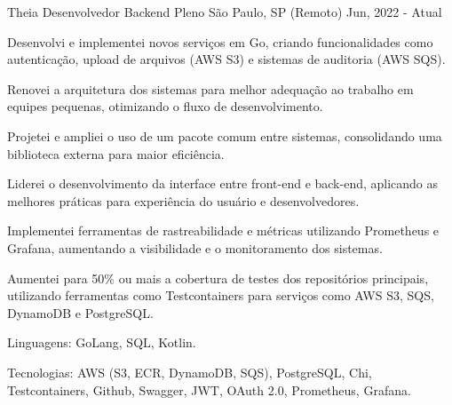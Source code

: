 \begin{cventries}
  \cventry
  {Theia} %
  {Desenvolvedor Backend Pleno} %
  {São Paulo, SP (Remoto)} %
  {Jun, 2022 - Atual} %
  {
    \begin{cvitems} %
      \item {Desenvolvi e implementei novos serviços em Go, criando funcionalidades como autenticação, upload de arquivos (AWS S3) e sistemas de auditoria (AWS SQS).}
      \item {Renovei a arquitetura dos sistemas para melhor adequação ao trabalho em equipes pequenas, otimizando o fluxo de desenvolvimento.}
      \item {Projetei e ampliei o uso de um pacote comum entre sistemas, consolidando uma biblioteca externa para maior eficiência.}
      \item {Liderei o desenvolvimento da interface entre front-end e back-end, aplicando as melhores práticas para experiência do usuário e desenvolvedores.}
      \item {Implementei ferramentas de rastreabilidade e métricas utilizando Prometheus e Grafana, aumentando a visibilidade e o monitoramento dos sistemas.}
      \item {Aumentei para 50\% ou mais a cobertura de testes dos repositórios principais, utilizando ferramentas como Testcontainers para serviços como AWS S3, SQS, DynamoDB e PostgreSQL.}
      \item {Linguagens: GoLang, SQL, Kotlin.}
      \item {Tecnologias: AWS (S3, ECR, DynamoDB, SQS), PostgreSQL, Chi, Testcontainers, Github, Swagger, JWT, OAuth 2.0, Prometheus, Grafana.}
    \end{cvitems}
  }



\end{cventries}
